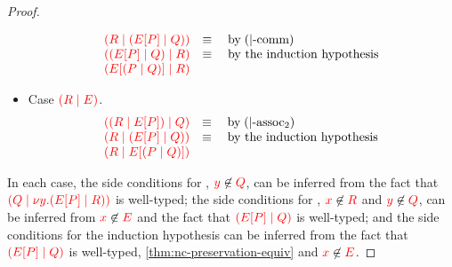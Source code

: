 \begin{proof}
\begin{itemize}
\[\begin{array}{ll}
        \textcolor{red}{(R \mid ({E}[{P}] \mid Q))} & \equiv \quad \text{by} \; (|\text{-comm}) \\
        \textcolor{red}{(({E}[{P}] \mid Q) \mid R)} & \equiv \quad \text{by the induction hypothesis} \\
        \textcolor{red}{({E}[{(P \mid Q)}] \mid R)} &
      \end{array}
    \]
  \item
    Case $\textcolor{red}{(R \mid E)}$.
    \[\!
      \begin{array}{ll}
        \textcolor{red}{((R \mid {E}[{P}]) \mid Q)} & \equiv \quad \text{by} \; (|\text{-assoc}_2) \\
        \textcolor{red}{(R \mid ({E}[{P}] \mid Q))} & \equiv \quad \text{by the induction hypothesis} \\
        \textcolor{red}{(R \mid {E}[{(P \mid Q)}])} &
      \end{array}
    \]
  \end{itemize}
  In each case, the side conditions for , $\textcolor{red}{y}\not\in\textcolor{red}{Q}$,
  can be inferred from the fact that
  $\textcolor{red}{(Q \mid \nu y.({E}[{P}] \mid R))}$ is well-typed; the side
  conditions for , $\textcolor{red}{x}\not\in\textcolor{red}{R}$ and $\textcolor{red}{y}\not\in\textcolor{red}{Q}$, can
  be inferred from $\textcolor{red}{x}\not\in\textcolor{red}{E}$ and the fact that
  $\textcolor{red}{({E}[{P}] \mid Q)}$ is well-typed; and the side conditions for
  the induction hypothesis can be inferred from the fact that
  $\textcolor{red}{({E}[{P}] \mid Q)}$ is well-typed,
  \cref{thm:nc-preservation-equiv} and $\textcolor{red}{x}\not\in\textcolor{red}{E}$. 
\end{proof}
